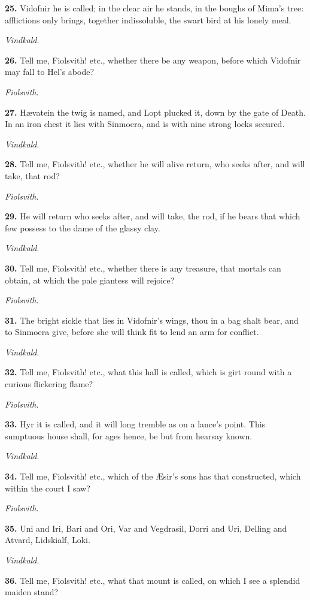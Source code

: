 \textbf{25.} Vidofnir he is called; in the clear air he stands, in the boughs
of Mima's tree: afflictions only brings, together indissoluble, the
swart bird at his lonely meal.

\emph{Vindkald}.

\textbf{26.} Tell me, Fiolsvith! etc., whether there be any weapon, before
which Vidofnir may fall to Hel's abode?

\emph{Fiolsvith}.

\textbf{27.} Hævatein the twig is named, and Lopt plucked it, down by the
gate of Death. In an iron chest it lies with Sinmoera, and is with
nine strong locks secured.

\emph{Vindkald}.

\textbf{28.} Tell me, Fiolsvith! etc., whether he will alive return, who
seeks after, and will take, that rod?

\emph{Fiolsvith}.

\textbf{29.} He will return who seeks after, and will take, the rod, if he
bears that which few possess to the dame of the glassy clay.

\emph{Vindkald}.

\textbf{30.} Tell me, Fiolsvith! etc., whether there is any treasure, that
mortals can obtain, at which the pale giantess will rejoice?

\emph{Fiolsvith}.

\textbf{31.} The bright sickle that lies in Vidofnir's wings, thou in a bag
shalt bear, and to Sinmoera give, before she will think fit to lend an
arm for conflict.

\emph{Vindkald}.

\textbf{32.} Tell me, Fiolsvith! etc., what this hall is called, which is
girt round with a curious flickering flame?

\emph{Fiolsvith}.

\textbf{33.} Hyr it is called, and it will long tremble as on a lance's
point. This sumptuous house shall, for ages hence, be but from hearsay
known.

\emph{Vindkald}.

\textbf{34.} Tell me, Fiolsvith! etc., which of the Æsir's sons has that
constructed, which within the court I saw?

\emph{Fiolsvith}.

\textbf{35.} Uni and Iri, Bari and Ori, Var and Vegdrasil, Dorri and Uri,
Delling and Atvard, Lidskialf, Loki.

\emph{Vindkald}.

\textbf{36.} Tell me, Fiolsvith! etc., what that mount is called, on which I
see a splendid maiden stand?

